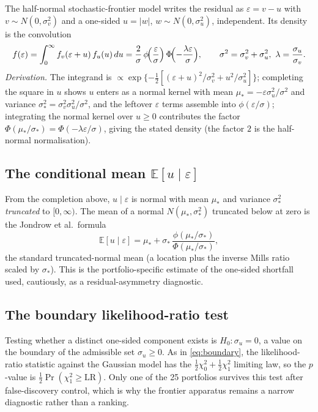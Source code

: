 The half-normal stochastic-frontier model writes the residual as
$\varepsilon=v-u$ with $v\sim N(0,\sigma_v^2)$ and a one-sided
$u=\lvert w\rvert$, $w\sim N(0,\sigma_u^2)$, independent. Its density is the
convolution
\begin{equation}
f(\varepsilon)=\int_0^{\infty} f_v(\varepsilon+u)\,f_u(u)\,du
=\frac{2}{\sigma}\,\phi\!\Bigl(\frac{\varepsilon}{\sigma}\Bigr)\,
\Phi\!\Bigl(-\frac{\lambda\varepsilon}{\sigma}\Bigr),
\qquad \sigma^2=\sigma_v^2+\sigma_u^2,\ \lambda=\frac{\sigma_u}{\sigma_v}.
\end{equation}
\emph{Derivation.} The integrand is
$\propto\exp\{-\tfrac12[(\varepsilon+u)^2/\sigma_v^2+u^2/\sigma_u^2]\}$;
completing the square in $u$ shows $u$ enters as a normal kernel with mean
$\mu_*=-\varepsilon\sigma_u^2/\sigma^2$ and variance
$\sigma_*^2=\sigma_v^2\sigma_u^2/\sigma^2$, and the leftover $\varepsilon$
terms assemble into $\phi(\varepsilon/\sigma)$; integrating the normal
kernel over $u\ge 0$ contributes the factor
$\Phi(\mu_*/\sigma_*)=\Phi(-\lambda\varepsilon/\sigma)$, giving the stated
density (the factor $2$ is the half-normal normalisation).

\subsection{The conditional mean $\mathbb{E}[u\mid\varepsilon]$}

From the completion above, $u\mid\varepsilon$ is normal with mean $\mu_*$
and variance $\sigma_*^2$ \emph{truncated} to $[0,\infty)$. The mean of a
normal $N(\mu_*,\sigma_*^2)$ truncated below at zero is the Jondrow et
al.\ formula
\begin{equation}\label{eq:jondrow}
\mathbb{E}[u\mid\varepsilon]=\mu_*+\sigma_*\,
\frac{\phi(\mu_*/\sigma_*)}{\Phi(\mu_*/\sigma_*)},
\end{equation}
the standard truncated-normal mean (a location plus the inverse Mills ratio
scaled by $\sigma_*$). This is the portfolio-specific estimate of the
one-sided shortfall used, cautiously, as a residual-asymmetry diagnostic.

\subsection{The boundary likelihood-ratio test}

Testing whether a distinct one-sided component exists is $H_0:\sigma_u=0$,
a value on the boundary of the admissible set $\sigma_u\ge 0$. As in
\eqref{eq:boundary}, the likelihood-ratio statistic against the Gaussian
model has the $\tfrac12\chi^2_0+\tfrac12\chi^2_1$ limiting law, so the
$p$-value is $\tfrac12\Pr(\chi^2_1\ge\mathrm{LR})$. Only one of the 25
portfolios survives this test after false-discovery control, which is why
the frontier apparatus remains a narrow diagnostic rather than a ranking.

